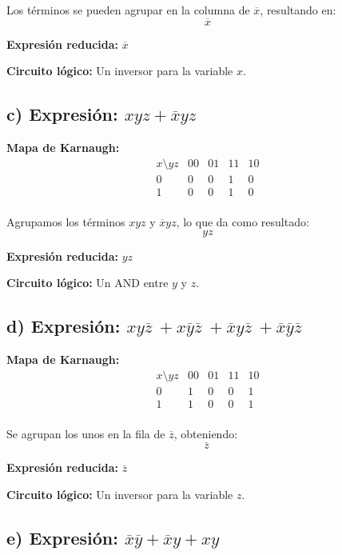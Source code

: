 \documentclass[11pt,letterpaper]{article}
\begin{document}
Los términos se pueden agrupar en la columna de \( \overline{x} \), resultando en:
\[
\overline{x}
\]

\textbf{Expresión reducida:} \( \overline{x} \)

\textbf{Circuito lógico:} Un inversor para la variable \( x \).

\subsection*{c) Expresión: \( xyz + \overline{x}yz \)}

\textbf{Mapa de Karnaugh:}
\[
\begin{array}{c|cccc}
x \setminus yz & 00 & 01 & 11 & 10 \\
\hline
0 & 0 & 0 & 1 & 0 \\
1 & 0 & 0 & 1 & 0 \\
\end{array}
\]

Agrupamos los términos \( xyz \) y \( \overline{x}yz \), lo que da como resultado:
\[
yz
\]

\textbf{Expresión reducida:} \( yz \)

\textbf{Circuito lógico:} Un AND entre \( y \) y \( z \).

\subsection*{d) Expresión: \( xy\overline{z} \ + x\overline{y} \overline{z} \ + \overline{x}y\overline{z} \ + \overline{x}\overline{y} \overline{z} \)}

\textbf{Mapa de Karnaugh:}
\[
\begin{array}{c|cccc}
x \setminus yz & 00 & 01 & 11 & 10 \\
\hline
0 & 1 & 0 & 0 & 1 \\
1 & 1 & 0 & 0 & 1 \\
\end{array}
\]

Se agrupan los unos en la fila de \( \overline{z} \), obteniendo:
\[
\overline{z} \
\]

\textbf{Expresión reducida:} \( \overline{z} \)

\textbf{Circuito lógico:} Un inversor para la variable \( z \).

\subsection*{e) Expresión: \( \overline{x}\overline{y} + \overline{x}y + xy \)}
\end{document}
